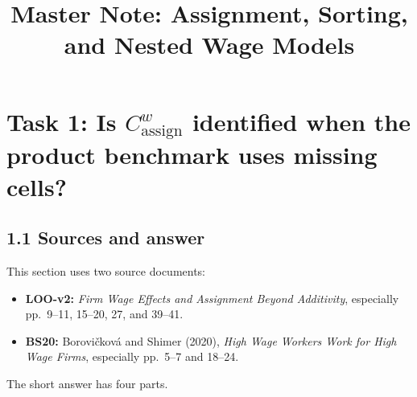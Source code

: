 \documentclass[11pt]{article}
\title{Master Note: Assignment, Sorting, and Nested Wage Models}
\author{}
\date{}
\begin{document}
\maketitle

\section{Task 1: Is \(C^w_{\mathrm{assign}}\) identified when the product benchmark uses missing cells?}

\subsection{1.1 Sources and answer}

This section uses two source documents:

\begin{itemize}
\item \textbf{LOO-v2:} \emph{Firm Wage Effects and Assignment Beyond Additivity},
  especially pp.\ 9--11, 15--20, 27, and 39--41.
\item \textbf{BS20:} Borovi\v{c}kov\'a and Shimer (2020),
  \emph{High Wage Workers Work for High Wage Firms}, especially pp.\ 5--7 and
  18--24.
\end{itemize}

The short answer has four parts.
\end{document}
